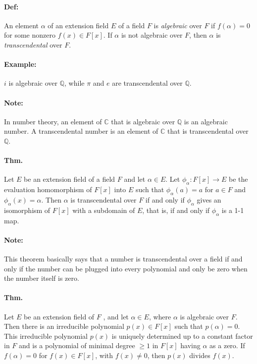 \documentclass[10pt,a4paper]{article}
\begin{document}
\paragraph{Def:} An element $\alpha$ of an extension field $E$ of a field $F$ is \textit{algebraic} over $F$ if $f(\alpha) = 0$ for some nonzero $f(x) \in F[x]$. If $\alpha$ is not algebraic over $F$, then $\alpha$ is \textit{transcendental} over $F$.

\paragraph{Example:} $i$ is algebraic over $\mathbb{Q}$, while $\pi$ and $e$ are transcendental over $\mathbb{Q}$.

\paragraph{Note:} In number theory, an element of $\mathbb{C}$ that is algebraic over $\mathbb{Q}$ is an algebraic number. A transcendental number is an element of $\mathbb{C}$ that is transcendental over $\mathbb{Q}$.

\paragraph{Thm.} Let $E$ be an extension field of a field $F$ and let $\alpha \in E$. Let $\phi_\alpha: F[x] \to E$ be the evaluation homomorphism of $F[x]$ into $E$ such that $\phi_\alpha(a) = a$ for $a \in F$ and $\phi_\alpha(x) = \alpha$. Then $\alpha$ is transcendental over $F$ if and only if $\phi_\alpha$ gives an isomorphism of $F[x]$ with a subdomain of $E$, that is, if and only if $\phi_\alpha$ is a 1-1 map.

\paragraph{Note:} This theorem basically says that a number is transcendental over a field if and only if the number can be plugged into every polynomial and only be zero when the number itself is zero.

\paragraph{Thm.} Let $E$ be an extension field of $F$ , and let $\alpha \in E$, where $\alpha$ is algebraic over $F$. Then there is an irreducible polynomial $p(x) \in F[x]$ such that $p(\alpha) = 0$. This irreducible polynomial $p(x)$ is uniquely determined up to a constant factor in $F$ and is a polynomial of minimal degree $ \geq 1$ in $F[x]$ having $\alpha$ as a zero. If $f(\alpha) =0$ for $f(x) \in F[x]$, with $f(x) \neq 0 $, then $p(x)$ divides $f(x)$.
\end{document}
